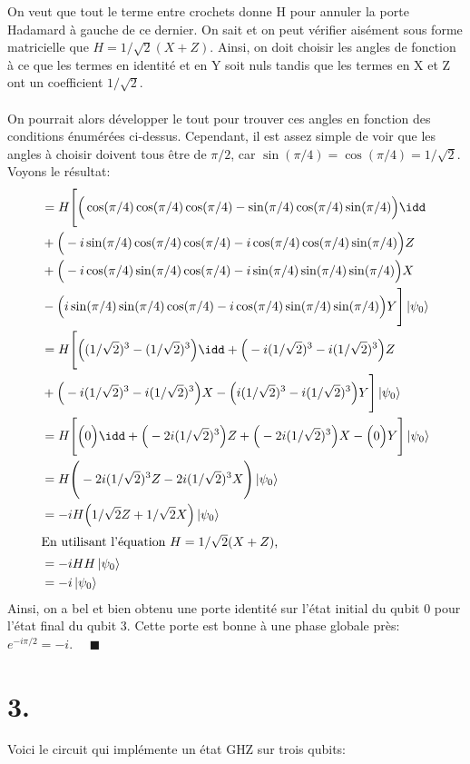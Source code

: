 \documentclass{article}
\begin{document}
On veut que tout le terme entre crochets donne H pour annuler la porte Hadamard à gauche de ce dernier. On sait et on peut vérifier aisément sous forme matricielle que $H = 1/\sqrt{2}(X + Z)$. Ainsi, on doit choisir les angles de fonction à ce que les termes en identité et en Y soit nuls tandis que les termes en X et Z ont un coefficient $1/\sqrt{2}$.
\\\\
On pourrait alors développer le tout pour trouver ces angles en fonction des conditions énumérées ci-dessus. Cependant, il est assez simple de voir que les angles à choisir doivent tous être de $\pi/2$, car $\sin(\pi/4) = \cos(\pi/4)=1/\sqrt{2}$. 
\\
Voyons le résultat:
\begin{align*}
    &= H\Bigg[\Big(\cos(\pi/4)\cos(\pi/4)\cos(\pi/4) - \sin(\pi/4)\cos(\pi/4)\sin(\pi/4)\Big)\idd
    \\
    &+ \Big(-i\sin(\pi/4)\cos(\pi/4)\cos(\pi/4) -i\cos(\pi/4)\cos(\pi/4)\sin(\pi/4)\Big)Z
    \\
    &+ \Big(-i\cos(\pi/4)\sin(\pi/4)\cos(\pi/4) - i\sin(\pi/4)\sin(\pi/4)\sin(\pi/4)\Big)X
    \\
    &- \Big(i\sin(\pi/4)\sin(\pi/4)\cos(\pi/4) - i\cos(\pi/4)\sin(\pi/4)\sin(\pi/4)\Big)Y \Bigg] \ket{\psi_0}
    \\
    &= H\Bigg[\Big((1/\sqrt{2})^3 - (1/\sqrt{2})^3\Big)\idd + \Big(-i(1/\sqrt{2})^3 -i(1/\sqrt{2})^3\Big)Z
    \\
    &+ \Big(-i(1/\sqrt{2})^3 - i(1/\sqrt{2})^3\Big)X - \Big(i(1/\sqrt{2})^3 - i(1/\sqrt{2})^3\Big)Y \Bigg] \ket{\psi_0}
    \\
    &= H\Bigg[\Big(0\Big)\idd + \Big(-2i(1/\sqrt{2})^3\Big)Z + \Big(-2i(1/\sqrt{2})^3\Big)X - \Big(0\Big)Y \Bigg]\ket{\psi_0} 
    \\
    &= H\Bigg(-2i(1/\sqrt{2})^3Z -2i(1/\sqrt{2})^3X \Bigg)\ket{\psi_0} 
    \\
    &= -iH\Big(1/\sqrt{2}Z + 1/\sqrt{2}X\Big)\ket{\psi_0}
    \\
    \intertext{En utilisant l'équation $H = 1/\sqrt{2}(X + Z)$,}
    &= -iHH\ket{\psi_0}
    \\
    &= -i\ket{\psi_0}
\end{align*}
Ainsi, on a bel et bien obtenu une porte identité sur l'état initial du qubit 0 pour l'état final du qubit 3. Cette porte est bonne à une phase globale près: $e^{-i\pi/2} = -i$. \ \ $\blacksquare$


\section*{3.}
Voici le circuit qui implémente un état GHZ sur trois qubits:
\end{document}
